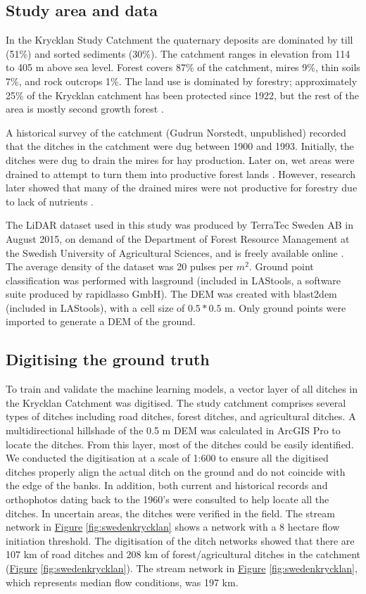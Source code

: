 \documentclass[11pt, review]{elsarticle} %
\begin{document}
\subsection{Study area and data}
In the Krycklan Study Catchment the quaternary deposits are dominated by till (51\%) and sorted sediments (30\%). The catchment ranges in elevation from 114 to 405 m above sea level. Forest covers 87\% of the catchment, mires 9\%, thin soils 7\%, and rock outcrops 1\%. The land use is dominated by forestry; approximately 25\% of the Krycklan catchment has been protected since 1922, but  the rest of the area is mostly second growth forest \citep{krycklancatchment}. 

A historical survey of the catchment (Gudrun Norstedt, unpublished) recorded  that the ditches in the catchment were dug between 1900 and 1993. Initially, the ditches were dug to drain the mires for hay production. Later on, wet areas were drained to attempt to turn them into productive forest lands \citep{paivanen}. However, research later showed that many of the drained mires were not productive for forestry due to lack of nutrients \citep{sikstrom}.

The LiDAR dataset used in this study was produced by TerraTec Sweden AB in August 2015, on demand of the Department of Forest Resource Management at the Swedish University of Agricultural Sciences, and is freely available online \citep{dataset}. The average density of the dataset was 20 pulses per $m^2$.  Ground point classification was performed with lasground (included in LAStools, a software suite produced by rapidlasso GmbH). The DEM was created with blast2dem (included in LAStools), with a cell size of $0.5*0.5$ m. Only ground points were imported to generate a DEM of the ground.

\subsection{Digitising the ground truth}
To train and validate the machine learning models, a vector layer of all ditches in the Krycklan Catchment \citep{krycklancatchment} was digitised. The study catchment comprises several types of ditches including road ditches, forest ditches, and agricultural ditches. A multidirectional hillshade of the 0.5 m DEM was calculated in ArcGIS Pro to locate the ditches. From this layer, most of the ditches could be easily identified. We conducted the digitisation at a scale of 1:600 to ensure all the digitised ditches properly align the actual ditch on the ground and do not coincide with the edge of the banks. In addition, both current and historical records and orthophotos dating back to the 1960's were consulted to help locate all the ditches. In uncertain areas, the ditches were verified in the field. The stream network in \hyperref[fig:swedenkrycklan]{Figure} \ref{fig:swedenkrycklan} shows a network with a 8 hectare flow initiation threshold. The digitisation of the ditch networks showed that there are 107 km of road ditches and 208 km of forest/agricultural ditches in the catchment (\hyperref[fig:swedenkrycklan]{Figure} \ref{fig:swedenkrycklan}). The stream network in \hyperref[fig:swedenkrycklan]{Figure} \ref{fig:swedenkrycklan}, which represents median flow conditions, was 197 km.
\end{document}

